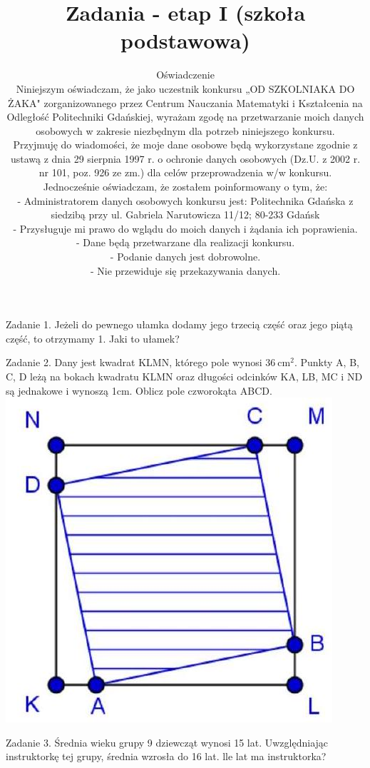 \documentclass[10pt]{article}
\title{Zadania - etap I (szkoła podstawowa) }
\author{Oświadczenie\\
Niniejszym oświadczam, że jako uczestnik konkursu „OD SZKOLNIAKA DO ŻAKA" zorganizowanego przez Centrum Nauczania Matematyki i Kształcenia na Odległość Politechniki Gdańskiej, wyrażam zgodę na przetwarzanie moich danych osobowych w zakresie niezbędnym dla potrzeb niniejszego konkursu.\\
Przyjmuję do wiadomości, że moje dane osobowe będą wykorzystane zgodnie z ustawą z dnia 29 sierpnia 1997 r. o ochronie danych osobowych (Dz.U. z 2002 r. nr 101, poz. 926 ze zm.) dla celów przeprowadzenia w/w konkursu.\\
Jednocześnie oświadczam, że zostałem poinformowany o tym, że:\\
- Administratorem danych osobowych konkursu jest: Politechnika Gdańska z siedzibą przy ul. Gabriela Narutowicza 11/12; 80-233 Gdańsk\\
- Przysługuje mi prawo do wglądu do moich danych i żądania ich poprawienia.\\
- Dane będą przetwarzane dla realizacji konkursu.\\
- Podanie danych jest dobrowolne.\\
- Nie przewiduje się przekazywania danych.}
\date{}
\begin{document}
\maketitle
Zadanie 1. Jeżeli do pewnego ułamka dodamy jego trzecią część oraz jego piątą część, to otrzymamy 1. Jaki to ułamek?

Zadanie 2. Dany jest kwadrat KLMN, którego pole wynosi \(36 \mathrm{~cm}^{2}\). Punkty A, B, C, D leżą na bokach kwadratu KLMN oraz długości odcinków KA, LB, MC i ND są jednakowe i wynoszą 1cm. Oblicz pole czworokąta ABCD.\\
\includegraphics[max width=\textwidth, center]{2024_11_21_dcd2fc8702c4ba725104g-1(1)}

Zadanie 3. Średnia wieku grupy 9 dziewcząt wynosi 15 lat. Uwzględniając instruktorkę tej grupy, średnia wzrosła do 16 lat. lle lat ma instruktorka?
\end{document}
